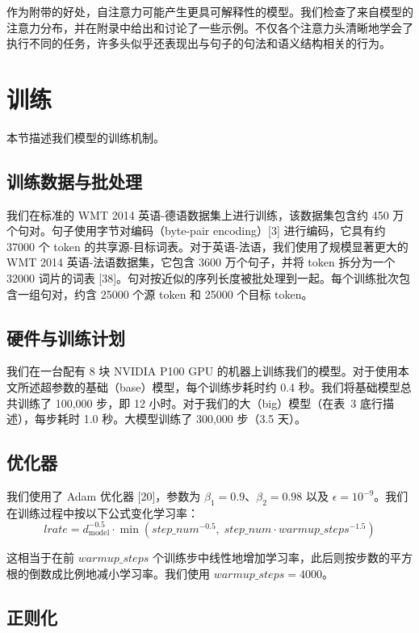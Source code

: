 \documentclass[11pt,UTF8,fontset=fandol]{ctexart}
\newcommand{\dmodel}{d_{\mathrm{model}}}
\begin{document}
作为附带的好处，自注意力可能产生更具可解释性的模型。我们检查了来自模型的注意力分布，并在附录中给出和讨论了一些示例。不仅各个注意力头清晰地学会了执行不同的任务，许多头似乎还表现出与句子的句法和语义结构相关的行为。

\section{训练}

本节描述我们模型的训练机制。

\subsection{训练数据与批处理}

我们在标准的 WMT 2014 英语-德语数据集上进行训练，该数据集包含约 450 万个句对。句子使用字节对编码（byte-pair encoding）[3] 进行编码，它具有约 37000 个 token 的共享源-目标词表。对于英语-法语，我们使用了规模显著更大的 WMT 2014 英语-法语数据集，它包含 3600 万个句子，并将 token 拆分为一个 32000 词片的词表 [38]。句对按近似的序列长度被批处理到一起。每个训练批次包含一组句对，约含 25000 个源 token 和 25000 个目标 token。

\subsection{硬件与训练计划}

我们在一台配有 8 块 NVIDIA P100 GPU 的机器上训练我们的模型。对于使用本文所述超参数的基础（base）模型，每个训练步耗时约 0.4 秒。我们将基础模型总共训练了 100,000 步，即 12 小时。对于我们的大（big）模型（在表~3 底行描述），每步耗时 1.0 秒。大模型训练了 300,000 步（3.5 天）。

\subsection{优化器}

我们使用了 Adam 优化器 [20]，参数为 $\beta_1 = 0.9$、$\beta_2 = 0.98$ 以及 $\epsilon = 10^{-9}$。我们在训练过程中按以下公式变化学习率：
\begin{equation}
lrate = \dmodel^{-0.5} \cdot \min\!\left(step\_num^{-0.5},\; step\_num \cdot warmup\_steps^{-1.5}\right)
\tag{3}
\end{equation}

这相当于在前 $warmup\_steps$ 个训练步中线性地增加学习率，此后则按步数的平方根的倒数成比例地减小学习率。我们使用 $warmup\_steps = 4000$。

\subsection{正则化}
\end{document}
